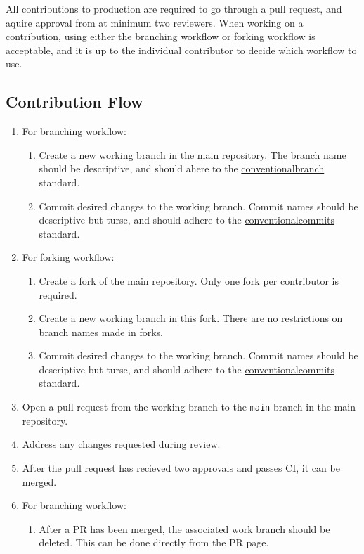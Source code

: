 \documentclass{article}
\begin{document}
All contributions to production are required to go through a pull request, and aquire approval from
at minimum two reviewers. When working on a contribution, using either the branching workflow or
forking workflow is acceptable, and it is up to the individual contributor to decide which workflow
to use.

\subsection{Contribution Flow}
\begin{enumerate}
	\item For branching workflow:
		\begin{enumerate}
			\item Create a new working branch in the main repository. The branch name should be
				descriptive, and should ahere to the
				\href{https://conventionalbranch.org/}{conventionalbranch} standard.
			\item Commit desired changes to the working branch. Commit names should be descriptive
				but turse, and should adhere to the
				\href{https://www.conventionalcommits.org/en/v1.0.0/}{conventionalcommits}
				standard.
		\end{enumerate}
	\item For forking workflow:
		\begin{enumerate}
			\item Create a fork of the main repository. Only one fork per contributor is required.
			\item Create a new working branch in this fork. There are no restrictions on branch
				names made in forks.
			\item Commit desired changes to the working branch. Commit names should be descriptive
				but turse, and should adhere to the
				\href{https://www.conventionalcommits.org/en/v1.0.0/}{conventionalcommits}
				standard.
		\end{enumerate}
	\item Open a pull request from the working branch to the \verb|main| branch in the main repository.
	\item Address any changes requested during review.
	\item After the pull request has recieved two approvals and passes CI, it can be merged.
	\item For branching workflow:
		\begin{enumerate}
			\item After a PR has been merged, the associated work branch should be deleted. This can
				be done directly from the PR page.
		\end{enumerate}
\end{enumerate}
\end{document}
